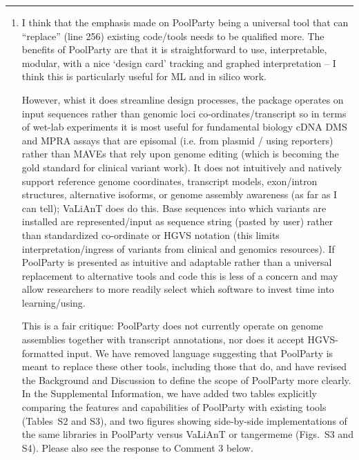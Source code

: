 \documentclass[11pt]{article}
\newenvironment{response}{\par\color{responseblue}}{\par}
\newcommand{\reviewersection}[1]{%
  \bigskip\par\noindent{\large\bfseries #1}\par\medskip\hrule\medskip}
\begin{document}
\begin{enumerate}
\end{enumerate}

\reviewersection{Reviewer 3}

\begin{enumerate}
\item I think that the emphasis made on PoolParty being a universal tool that
can ``replace'' (line 256) existing code/tools needs to be qualified more. The
benefits of PoolParty are that it is straightforward to use, interpretable,
modular, with a nice `design card' tracking and graphed interpretation -- I
think this is particularly useful for ML and in silico work.

However, whist it does streamline design processes, the package operates on
input sequences rather than genomic loci co-ordinates/transcript so in terms of
wet-lab experiments it is most useful for fundamental biology cDNA DMS and MPRA
assays that are episomal (i.e. from plasmid / using reporters) rather than MAVEs
that rely upon genome editing (which is becoming the gold standard for clinical
variant work). It does not intuitively and natively support reference genome
coordinates, transcript models, exon/intron structures, alternative isoforms,
or genome assembly awareness (as far as I can tell); VaLiAnT does do this. Base
sequences into which variants are installed are represented/input as sequence
string (pasted by user) rather than standardized co-ordinate or HGVS notation
(this limits interpretation/ingress of variants from clinical and genomics
resources). If PoolParty is presented as intuitive and adaptable rather than a
universal replacement to alternative tools and code this is less of a concern
and may allow researchers to more readily select which software to invest time
into learning/using.

\begin{response}
This is a fair critique: PoolParty does not currently operate on genome assemblies together with transcript annotations, nor does it accept HGVS-formatted input. We have removed language suggesting that PoolParty is meant to replace these other tools, including those that do, and have revised the Background and Discussion to define the scope of PoolParty more clearly. In the Supplemental Information, we have added two tables explicitly comparing the features and capabilities of PoolParty with existing tools (Tables~S2 and S3), and two figures showing side-by-side implementations of the same libraries in PoolParty versus VaLiAnT or tangermeme (Figs.~S3 and S4). Please also see the response to Comment 3 below.  
\end{response}


\end{enumerate}
\end{document}
